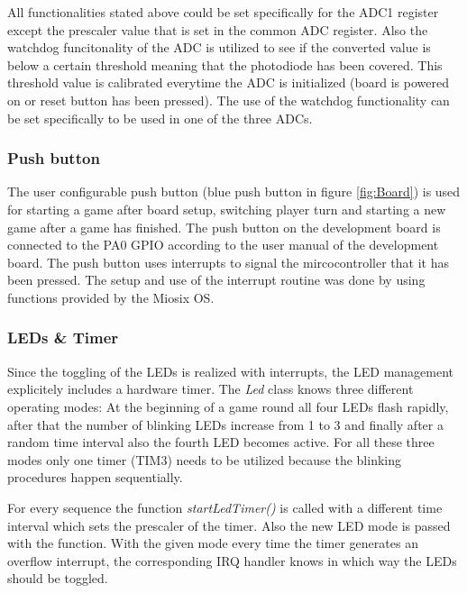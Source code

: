 All functionalities stated above could be set specifically for the ADC1 register except the prescaler value that is set in the common ADC register. Also the watchdog funcitonality of the ADC is utilized to see if the converted value is below a certain threshold meaning that the photodiode has been covered. This threshold value is calibrated everytime the ADC is initialized (board is powered on or reset button has been pressed). The use of the watchdog functionality can be set specifically to be used in one of the three ADCs.

\subsubsection{Push button}
The user configurable push button (blue push button in figure \ref{fig:Board}) is used for starting a game after board setup, switching player turn and starting a new game after a game has finished. The push button on the development board is connected to the PA0 GPIO according to the user manual \cite{UsrManual} of the development board. The push button uses interrupts to signal the mircocontroller that it has been pressed. The setup and use of the interrupt routine was done by using functions provided by the Miosix OS.


\subsubsection{LEDs \& Timer}
Since the toggling of the LEDs is realized with interrupts, the LED management explicitely includes a hardware timer. The \emph{Led} class knows three different operating modes: At the beginning of a game round all four LEDs flash rapidly, after that the number of blinking LEDs increase from 1 to 3 and finally after a random time interval also the fourth LED becomes active. For all these three modes only one timer (TIM3) needs to be utilized because the blinking procedures happen sequentially.\\
\par
For every sequence the function \emph{startLedTimer()} is called with a different time interval which sets the prescaler of the timer. Also the new LED mode is passed with the function. With the given mode every time the timer generates an overflow interrupt, the corresponding IRQ handler knows in which way the LEDs should be toggled.

